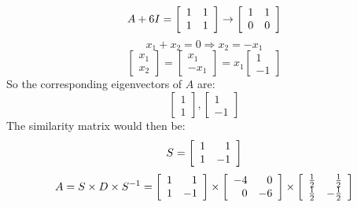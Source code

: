 \documentclass[12pt,letterpaper,reqno]{amsart}
\begin{document}
\begin{enumerate}
\begin{flushleft}
$$A+6I = \left[ \begin{array} { r r } { 1 } & { 1 } \\ { 1 } & { 1 } \end{array} \right] \rightarrow \left[ \begin{array} { r r } { 1 } & { 1 } \\ { 0 } & { 0 } \end{array} \right]$$
$$x_1 + x_2 = 0 \Rightarrow x_2 = -x_1$$
$$\left[ \begin{array} { r } { x_1 } \\ { x_2 } \end{array} \right] = \left[ \begin{array} { r } { x_1 } \\ { -x_1 } \end{array} \right] = x_1\left[ \begin{array} { r } { 1 } \\ { -1 } \end{array} \right]$$
So the corresponding eigenvectors of $A$ are:
$$\left[ \begin{array} { r } { 1 } \\ { 1 } \end{array} \right], \left[ \begin{array} { r } { 1 } \\ { -1 } \end{array} \right]$$
The similarity matrix would then be:
$$S = \left[ \begin{array} { r r } { 1 } & { 1 } \\ { 1 } & { -1 } \end{array} \right]$$
$$A = S \times D \times S^{-1} =  \left[ \begin{array} { r r } { 1 } & { 1 } \\ { 1 } & { -1 } \end{array} \right] \times  \left[ \begin{array} { r r } { -4 } & { 0 } \\ { 0 } & { -6 } \end{array} \right] \times  \left[ \begin{array} { r r } { \frac{1}{2} } & { \frac{1}{2} } \\ { \frac{1}{2} } & { -\frac{1}{2} } \end{array} \right]$$

\end{flushleft}
\end{enumerate}
\end{document}
